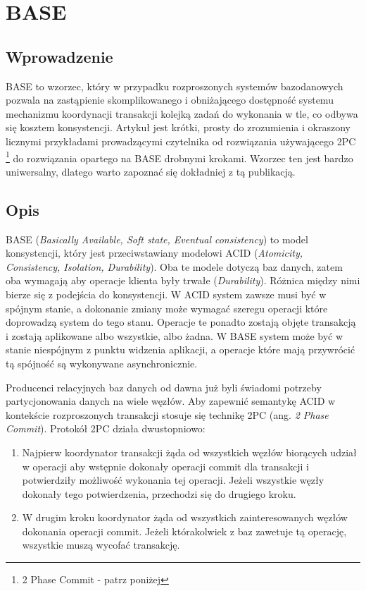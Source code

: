 \section{BASE}

\subsection*{Wprowadzenie}

BASE to wzorzec, który w przypadku rozproszonych systemów bazodanowych pozwala na zastąpienie skomplikowanego i obniżającego dostępność systemu mechanizmu koordynacji transakcji kolejką zadań do wykonania w tle, co odbywa się kosztem konsystencji.
Artykuł \cite{base-an-acid-alternative} jest krótki, prosty do zrozumienia i okraszony licznymi przykładami prowadzącymi czytelnika od rozwiązania używającego 2PC \footnote{2 Phase Commit - patrz poniżej} do rozwiązania opartego na BASE drobnymi krokami.
Wzorzec ten jest bardzo uniwersalny, dlatego warto zapoznać się dokładniej z tą publikacją.

\subsection*{Opis}

BASE (\emph{Basically Available, Soft state, Eventual consistency}) to model konsystencji, który jest przeciwstawiany modelowi ACID (\emph{Atomicity, Consistency, Isolation, Durability}). 
Oba te modele dotyczą baz danych, zatem oba wymagają aby operacje klienta były trwałe (\emph{Durability}).
Różnica między nimi bierze się z podejścia do konsystencji.
W ACID system zawsze musi być w spójnym stanie, a dokonanie zmiany może wymagać szeregu operacji które doprowadzą system do tego stanu.
Operacje te ponadto zostają objęte transakcją i zostają aplikowane albo wszystkie, albo żadna.
W BASE system może być w stanie niespójnym z punktu widzenia aplikacji, a operacje które mają przywrócić tą spójność są wykonywane asynchronicznie.

\label{sec:2-phase-commit}
Producenci relacyjnych baz danych od dawna już byli świadomi potrzeby partycjonowania danych na wiele węzłów.
Aby zapewnić semantykę ACID w kontekście rozproszonych transakcji stosuje się technikę 2PC (ang. \emph{2 Phase Commit}).
Protokół 2PC działa dwustopniowo:

\begin{enumerate}
 \item Najpierw koordynator transakcji żąda od wszystkich węzłów biorących udział w operacji aby wstępnie dokonały operacji commit dla transakcji i potwierdziły możliwość wykonania tej operacji.
 Jeżeli wszystkie węzły dokonały tego potwierdzenia, przechodzi się do drugiego kroku.
 \item W drugim kroku koordynator żąda od wszystkich zainteresowanych węzłów dokonania operacji commit.
 Jeżeli którakolwiek z baz zawetuje tą operację, wszystkie muszą wycofać transakcję.
\end{enumerate}

